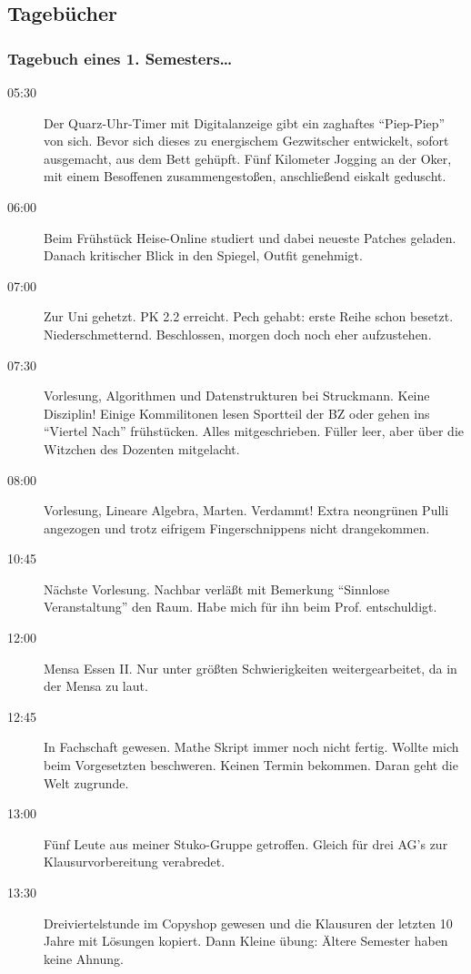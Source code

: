 \subsection{Tagebücher}
\subsubsection{Tagebuch eines 1. Semesters\ldots}

\begin{description}
\item[05:30] Der Quarz-Uhr-Timer mit Digitalanzeige gibt ein zaghaftes "`Piep-Piep"'
von sich. Bevor sich dieses zu energischem Gezwitscher entwickelt, sofort
ausgemacht, aus dem Bett gehüpft. Fünf Kilometer Jogging an der Oker,
mit einem Besoffenen zusammengestoßen, anschließend eiskalt geduscht.
\item[06:00] Beim Frühstück Heise-Online studiert und dabei neueste Patches geladen.
Danach kritischer Blick in den Spiegel, Outfit genehmigt.
\item[07:00] Zur Uni gehetzt. PK 2.2 erreicht. Pech gehabt: erste Reihe schon besetzt.
Niederschmetternd. Beschlossen, morgen doch noch eher aufzustehen.
\item[07:30] Vorlesung, Algorithmen und Datenstrukturen bei Struckmann. Keine Disziplin!
Einige Kommilitonen lesen
Sportteil der BZ oder gehen ins "`Viertel Nach"' frühstücken. Alles
mitgeschrieben. Füller leer, aber über die Witzchen des Dozenten mitgelacht.
\item[08:00] Vorlesung, Lineare Algebra, Marten. Verdammt! Extra neongrünen Pulli
angezogen und trotz eifrigem Fingerschnippens nicht drangekommen.
\item[10:45] Nächste Vorlesung. Nachbar verläßt mit Bemerkung "`Sinnlose
Veranstaltung"' den Raum. Habe mich für ihn beim Prof. entschuldigt.
\item[12:00] Mensa Essen II. Nur unter größten Schwierigkeiten
weitergearbeitet, da in der Mensa zu laut.
\item[12:45] In Fachschaft gewesen. Mathe Skript immer noch nicht fertig. Wollte
mich beim Vorgesetzten beschweren. Keinen Termin bekommen. Daran geht die
Welt zugrunde.
\item[13:00] Fünf Leute aus meiner Stuko-Gruppe getroffen. Gleich für drei AG's zur
Klausurvorbereitung verabredet.
\item[13:30] Dreiviertelstunde im Copyshop gewesen und die Klausuren der letzten 10
Jahre mit Lösungen kopiert. Dann Kleine übung: Ältere Semester haben keine
Ahnung.

\end{description}
